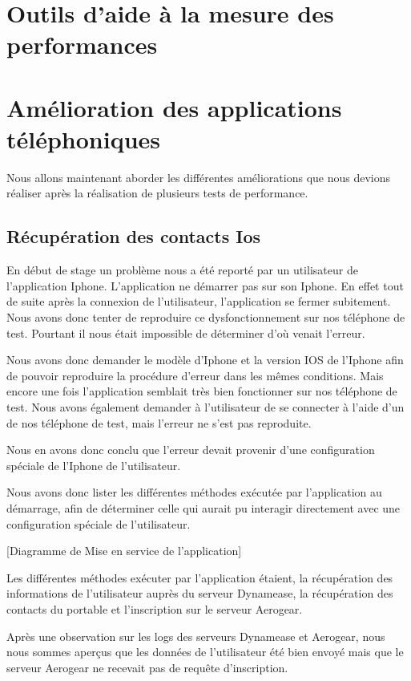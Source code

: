 \section{Outils d'aide à la mesure des performances}

\section{Amélioration des applications téléphoniques}

Nous allons maintenant aborder les différentes améliorations que nous devions réaliser après la réalisation de plusieurs tests de performance.

\subsection{Récupération des contacts Ios}

En début de stage un problème nous a été reporté par un utilisateur de l'application Iphone. L'application ne démarrer pas sur son Iphone. En effet tout de suite après la connexion de l'utilisateur, l'application se fermer subitement. Nous avons donc tenter de reproduire ce dysfonctionnement sur nos téléphone de test. Pourtant il nous était impossible de déterminer d'où venait l'erreur.

Nous avons donc demander le modèle d'Iphone et la version IOS de l'Iphone afin de pouvoir reproduire la procédure d'erreur dans les mêmes conditions. Mais encore une fois l'application semblait très bien fonctionner sur nos téléphone de test. Nous avons également demander à l'utilisateur de se connecter à l'aide d'un de nos téléphone de test, mais l'erreur ne s'est pas reproduite.

Nous en avons donc conclu que l'erreur devait provenir d'une configuration spéciale de l'Iphone de l'utilisateur.

Nous avons donc lister les différentes méthodes exécutée par l'application au démarrage, afin de déterminer celle qui aurait pu interagir directement avec une configuration spéciale de l'utilisateur.

[Diagramme de Mise en service de l'application]

Les différentes méthodes exécuter par l'application étaient, la récupération des informations de l'utilisateur auprès du serveur Dynamease, la récupération des contacts du portable et l'inscription sur le serveur Aerogear.

Après une observation sur les logs des serveurs Dynamease et Aerogear, nous nous sommes aperçus que les données de l'utilisateur été bien envoyé mais que le serveur Aerogear ne recevait pas de requête d'inscription.

